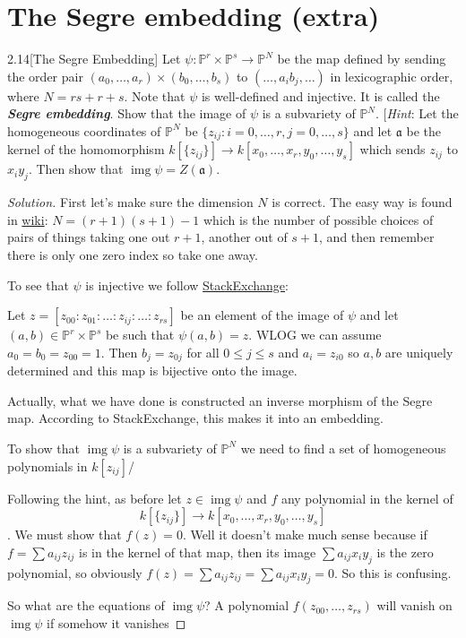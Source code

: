 \section{The Segre embedding (extra)}

\begin{manualexercise}{2.14}[The Segre Embedding]
	Let $\psi:\mathbb{P}^r\times\mathbb{P}^s\to\mathbb{P}^N$ be the map defined by sending the order pair $(a_0,\ldots,a_r)\times(b_0,\ldots,b_s)$ to $(\ldots,a_ib_j,\ldots)$ in lexicographic order, where $N=rs+r+s$. Note that $\psi$ is well-defined and injective. It is called the \textbf{\textit{Segre embedding}}. Show that the image of $\psi$ is a subvariety of $\mathbb{P}^N$. [\textit{Hint}: Let the homogeneous coordinates of $\mathbb{P}^N$ be $\{z_{ij}:i=0,\ldots,r,j=0,\ldots,s\}$ and let $\mathfrak{a}$ be the kernel of the homomorphism $k[\{z_{ij}\}]\to k[x_0,\ldots,x_r,y_0,\ldots,y_s]$ which sends $z_{ij}$ to $x_iy_j$. Then show that $\operatorname{img}\psi=Z(\mathfrak{a})$.
\end{manualexercise}

\begin{proof}[Solution]
	First let's make sure the dimension $N$ is correct. The easy way is found in \href{https://en.wikipedia.org/wiki/Segre_embedding}{wiki}: $N=(r+1)(s+1)-1$ which is the number of possible choices of pairs of things taking one out $r+1$, another out of $s+1$, and then remember there is only one zero index so take one away.
	
	To see that $\psi$ is injective we follow \href{https://math.stackexchange.com/questions/3683364/segre-map-is-an-embedding}{StackExchange}: 
	{\color{azure}Let $z=[z_{00}:z_{01}:\ldots:z_{ij}:\ldots:z_{rs}]$ be an element of the image of $\psi$ and let $(a,b)\in\mathbb{P}^r\times\mathbb{P}^s$ be such that $\psi(a,b)=z$. WLOG we can assume $a_0=b_0=z_{00}=1$. Then $b_j=z_{0j}$ for all $0\leq j\leq s$ and $a_i=z_{i0}$ so $a,b$ are uniquely determined and this map is bijective onto the image.
	
	Actually, what we have done is constructed an inverse morphism of the Segre map. According to StackExchange, this makes it into an embedding.}
	
	To show that $\operatorname{img}\psi$ is a subvariety of $\mathbb{P}^N$ we need to find a set of homogeneous polynomials in $k[z_{ij}]$/
	
	Following the hint, as before let $z\in\operatorname{img}\psi$ and $f$ any polynomial in the kernel of \[k[\{z_{ij}\}]\to k[x_0,\ldots,x_r,y_0,\ldots,y_s]\]. We must show that $f(z)=0$. Well it doesn't make much sense because if $f=\sum a_{ij}z_{ij}$ is in the kernel of that map, then its image $\sum a_{ij}x_iy_j$ is the zero polynomial, so obviously $f(z)=\sum a_{ij}z_{ij}=\sum a_{ij}x_iy_j=0$. So this is confusing.
	
	So what are the equations of $\operatorname{img}\psi$? A polynomial $f(z_{00},\ldots,z_{rs})$ will vanish on $\operatorname{img}\psi$ if somehow it vanishes 
\end{proof}


